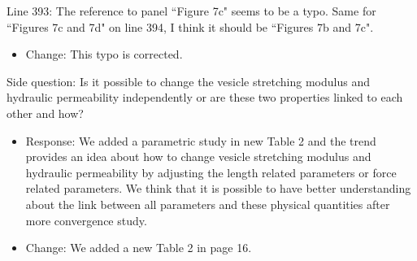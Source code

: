 \documentclass[11pt]{article}
\newcommand{\comment}[1]{{\color{blue} #1}}
\begin{document}
\noindent
\comment{Line 393: The reference to panel ``Figure 7c" seems to be a
typo. Same for ``Figures 7c and 7d" on line 394, I think it should be
``Figures 7b and 7c".}
\begin{itemize}
  \item Change: This typo is corrected.
\end{itemize}

\noindent
\comment{Side question: Is it possible to change the vesicle stretching
modulus and hydraulic permeability independently or are these two
properties linked to each other and how?}
\begin{itemize}
  \item Response: We added a parametric study in new Table 2 and the trend provides an idea about 
how to change vesicle stretching modulus and hydraulic permeability by adjusting the length related parameters or force related parameters. We think that it is possible to have better understanding about the link between all parameters and these physical quantities after more 
convergence study.
\item Change: We added a new Table 2 in page 16.
\end{itemize}
\end{document}
